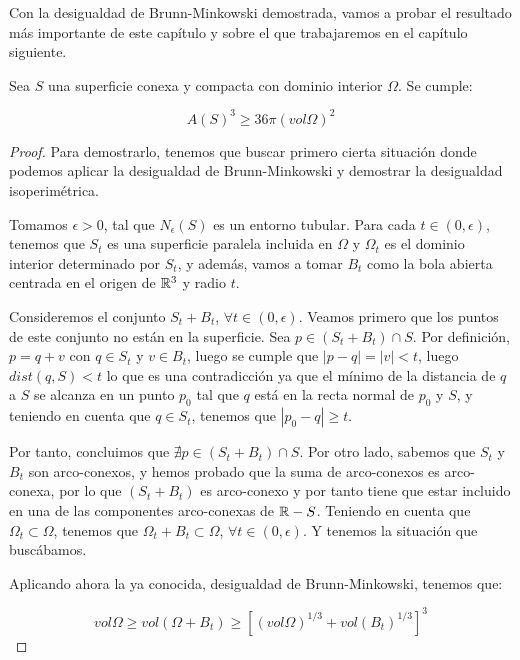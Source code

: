 Con la desigualdad de Brunn-Minkowski demostrada, vamos a probar el resultado más importante de este capítulo y sobre el que trabajaremos en el capítulo siguiente.
\begin{theorem}
Sea $S$ una superficie conexa y compacta con dominio interior $\Omega$. Se cumple:

\begin{equation*}
    A(S)^3 \geq 36\pi(vol \Omega)^2
\end{equation*}
\end{theorem}
\begin{proof}
Para demostrarlo, tenemos que buscar primero cierta situación donde podemos aplicar la desigualdad de Brunn-Minkowski y demostrar la desigualdad isoperimétrica.

Tomamos $\epsilon > 0$, tal que $N_\epsilon(S)$ es un entorno tubular. Para cada $t \in (0, \epsilon)$, tenemos que $S_t$ es una superficie paralela incluida en $\Omega$ y $\Omega_t$ es el dominio interior determinado por $S_t$, y además, vamos a tomar $B_t$ como la bola abierta centrada en el origen de $\mathbb{R}^3$ y radio $t$.

Consideremos el conjunto $S_t + B_t$, $\forall t \in (0, \epsilon)$. Veamos primero que los puntos de este conjunto no están en la superficie. Sea $p \in (S_t + B_t) \cap S$. Por definición, $p = q + v$ con $q \in S_t$ y $v \in B_t$, luego se cumple que $|p - q| = |v| < t$, luego $dist(q, S) < t$ lo que es una contradicción ya que el mínimo de la distancia de $q$ a $S$ se alcanza en un punto $p_0$ tal que $q$ está en la recta normal de $p_0$ y $S$, y teniendo en cuenta que $q \in S_t$, tenemos que $|p_0 - q| \geq t$.

Por tanto, concluimos que $\nexists p \in (S_t + B_t) \cap S$. Por otro lado, sabemos que $S_t$ y $B_t$ son arco-conexos, y hemos probado que la suma de arco-conexos es arco-conexa, por lo que $(S_t + B_t)$ es arco-conexo y por tanto tiene que estar incluido en una de las componentes arco-conexas de $\mathbb{R} - S$. Teniendo en cuenta que $\Omega_t \subset \Omega$, tenemos que $\Omega_t + B_t \subset \Omega$, $\forall t \in (0, \epsilon)$. Y tenemos la situación que buscábamos.

Aplicando ahora la ya conocida, desigualdad de Brunn-Minkowski, tenemos que:

\begin{equation*}
    vol \Omega \geq vol (\Omega + B_t) \geq \left[ (vol \Omega)^{1/3} + vol (B_t)^{1/3} \right]^3
\end{equation*}


\end{proof}
